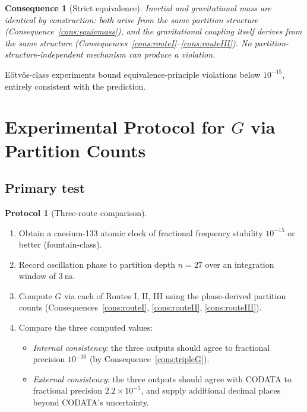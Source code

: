 \documentclass[11pt,twocolumn,a4paper]{article}
\theoremstyle{axiomstyle}
\theoremstyle{conseqstyle}
\newtheorem{consequence}{Consequence}
\theoremstyle{definition}
\newtheorem{protocol}{Protocol}
\theoremstyle{remark}
\begin{document}
\begin{consequence}[Strict equivalence]\label{cons:strictequiv}
Inertial and gravitational mass are identical by construction: both arise from the same partition structure (Consequence~\ref{cons:equivmass}), and the gravitational coupling itself derives from the same structure (Consequences~\ref{cons:routeI}--\ref{cons:routeIII}). No partition-structure-independent mechanism can produce a violation.
\end{consequence}

E\"otv\"os-class experiments \citep{touboul2017} bound equivalence-principle violations below $10^{-15}$, entirely consistent with the prediction.

\section{Experimental Protocol for $G$ via Partition Counts}
\label{sec:Gexperimental}

\subsection{Primary test}

\begin{protocol}[Three-route comparison]
\label{prot:threeroutes}
\begin{enumerate}[label=(\arabic*)]
\item Obtain a caesium-133 atomic clock of fractional frequency stability $10^{-15}$ or better (fountain-class).
\item Record oscillation phase to partition depth $n=27$ over an integration window of $3~\mathrm{ns}$.
\item Compute $G$ via each of Routes I, II, III using the phase-derived partition counts (Consequences~\ref{cons:routeI}, \ref{cons:routeII}, \ref{cons:routeIII}).
\item Compare the three computed values:
\begin{itemize}
\item \emph{Internal consistency}: the three outputs should agree to fractional precision $10^{-16}$ (by Consequence~\ref{cons:tripleG}).
\item \emph{External consistency}: the three outputs should agree with CODATA to fractional precision $2.2\times10^{-5}$, and supply additional decimal places beyond CODATA's uncertainty.
\end{itemize}
\end{enumerate}
\end{protocol}
\end{document}
